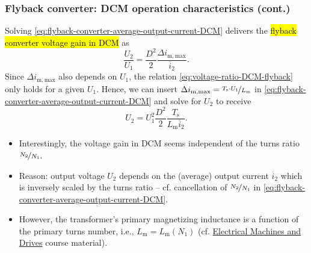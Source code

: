 \begin{frame}
	\frametitle{Flyback converter: DCM operation characteristics (cont.)}
	Solving \eqref{eq:flyback-converter-average-output-current-DCM} delivers the \hl{flyback converter voltage gain in DCM} as
	\begin{equation}
		\frac{U_2}{U_1} = \frac{D^2}{2} \frac{\Delta i_\mathrm{m,max}}{\overline{i}_2}.
		\label{eq:voltage-ratio-DCM-flyback}
	\end{equation}
	\pause%
	Since $\Delta i_\mathrm{m,max}$ also depends on $U_1$, the relation \eqref{eq:voltage-ratio-DCM-flyback} only holds for a given $U_1$. Hence, we can insert $\Delta i_\mathrm{m,max}=\nicefrac{T_\mathrm{s} \cdot U_1}{L_\mathrm{m}}$ in \eqref{eq:flyback-converter-average-output-current-DCM} and solve for $U_2$ to receive
	\begin{equation}
		U_2= U_1^2 \frac{D^2}{2} \frac{T_\mathrm{s}}{L_\mathrm{m} \overline{i}_2}.
	\end{equation}
	\begin{itemize}
		\item<3-> Interestingly, the voltage gain in DCM seems independent of the turns ratio $\nicefrac{N_2}{N_1}$.
		\item<4-> Reason: output voltage $U_2$ depends on the (average) output current $\overline{i}_2$ which is inversely scaled by the turns ratio -- cf. cancellation of $\nicefrac{N_2}{N_1}$ in \eqref{eq:flyback-converter-average-output-current-DCM}.
		\item<5-> However, the transformer's primary magnetizing inductance is a function of the primary turns number, i.e.,  $L_\mathrm{m}=L_\mathrm{m}(N_1)$ (cf. \href{https://github.com/IAS-Uni-Siegen/EMD_course}{Electrical Machines and Drives} course material).
	\end{itemize}
\end{frame}

